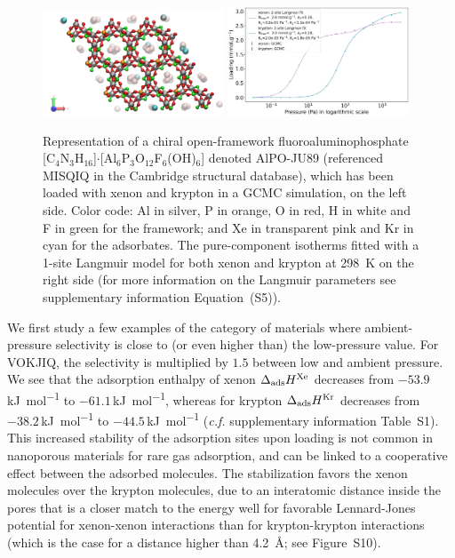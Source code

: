\documentclass[main.tex]{subfiles}
\begin{document}
  \begin{figure}[t]
  \centering
    \includegraphics[width=0.48\textwidth]{figures/2-thermo/MISQIQ_clean.jpg}\hfill
    \includegraphics[width=0.48\textwidth]{figures/2-thermo/MISQIQ_clean_isotherm_xenon_krypton_298K.jpg}
    \caption{Representation of a chiral open-framework fluoroaluminophosphate [C$_4$N$_3$H$_{16}$]$\cdot$[Al$_6$P$_3$O$_{12}$F$_6$(OH)$_6$] denoted AlPO-JU89 (referenced MISQIQ in the Cambridge structural database), which has been loaded with xenon and krypton in a GCMC simulation, on the left side.\cite{MISQIQ} Color code: Al in silver, P in orange, O in red, H in white and F in green for the framework; and Xe in transparent pink and Kr in cyan for the adsorbates. The pure-component isotherms fitted with a 1-site Langmuir model for both xenon and krypton at \SI{298}{\kelvin} on the right side (for more information on the Langmuir parameters see supplementary information Equation~(S5)).}
    \label{fgr:MISQIQ}
  \end{figure}
  
  We first study a few examples of the category of materials where ambient-pressure selectivity is close to (or even higher than) the low-pressure value. For VOKJIQ, the selectivity is multiplied by $1.5$ between low and ambient pressure. We see that the adsorption enthalpy of xenon $\Delta_{\text{ads}}H^{\text{Xe}}$ decreases from $-53.9$\,\si{\kilo\joule\per\mol} to $-61.1$\,\si{\kilo\joule\per\mol}, whereas for krypton $\Delta_{\text{ads}}H^{\text{Kr}}$ decreases from $-38.2$\,\si{\kilo\joule\per\mol} to $-44.5$\,\si{\kilo\joule\per\mol} (\emph{c.f.} supplementary information Table~S1). This increased stability of the adsorption sites upon loading is not common in nanoporous materials for rare gas adsorption, and can be linked to a cooperative effect between the adsorbed molecules. The stabilization favors the xenon molecules over the krypton molecules, due to an interatomic distance inside the pores that is a closer match to the energy well for favorable Lennard-Jones potential for xenon-xenon interactions than for krypton-krypton interactions (which is the case for a distance higher than \SI{4.2}{\angstrom}; see Figure~S10).
  
\end{document}
